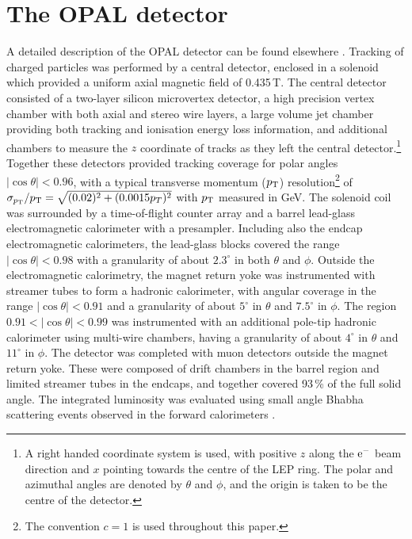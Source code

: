  
 


\section{The OPAL detector}
\label{sec:detector}
A detailed description of the OPAL detector can be found elsewhere 
\cite{Ahmet:1990eg, Anderson:1997xwa}. Tracking of charged particles was performed by a central
detector, enclosed in a solenoid which provided a uniform axial magnetic field
of 0.435\,T.  The central detector consisted of a two-layer silicon 
microvertex detector, a high precision vertex chamber with both axial
and stereo wire layers, a large volume jet chamber providing both tracking
and ionisation energy loss information,
and additional chambers to measure the $z$ coordinate of tracks as they
left the central detector.\footnote{A right handed coordinate system is used,
with positive $z$ along the $\rm e^-$ beam direction and $x$ pointing 
towards the centre of the LEP ring. The polar and azimuthal angles are denoted
by $\theta$ and $\phi$, and the origin is taken to be the centre of the
detector.} Together these detectors provided tracking coverage for polar angles
$|\cos\theta|<0.96$, with a typical transverse momentum ($p_{\rm T}$) 
resolution\footnote{The convention $c=1$ is used throughout this paper.} of 
$\sigma_{p_{\rm T}}/p_{\rm T}=\sqrt{(0.02)^2+(0.0015p_T)^2}$ 
with $p_{\rm T}$ measured in GeV.
The solenoid coil was surrounded by a time-of-flight counter array and 
a barrel lead-glass electromagnetic calorimeter with a presampler. Including
also the endcap electromagnetic calorimeters, the lead-glass blocks covered
the range $|\cos\theta|<0.98$ with a granularity of about $2.3^\circ$ in both
$\theta$ and $\phi$.
Outside the electromagnetic calorimetry, 
the magnet return yoke was instrumented with
streamer tubes to form a hadronic calorimeter, with angular coverage in the
range $|\cos\theta|<0.91$ and a granularity of about $5^\circ$ in $\theta$
and $7.5^\circ$ in $\phi$. The region $0.91<|\cos\theta|<0.99$ was instrumented
with an additional pole-tip hadronic calorimeter using multi-wire chambers,
having a granularity of about $4^\circ$ in $\theta$ and $11^\circ$ in $\phi$.
The detector was completed
with muon detectors outside the magnet return yoke. These were composed
of drift chambers in the barrel region and limited streamer tubes in the
endcaps, and together covered 93\,\% of the full solid angle.
The integrated luminosity was evaluated using small
angle Bhabha scattering events observed in the forward calorimeters 
\cite{Abbiendi:2003dh}. 


